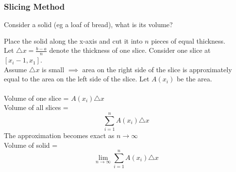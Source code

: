 \documentclass[english, 12pt]{article}
\begin{document}
\subsubsection{Slicing Method}
Consider a solid (eg a loaf of bread), what is its volume?
\begin{sol}
Place the solid along the x-axis and cut it into $n$ pieces of equal thickness.\\
Let $\triangle x = \frac{b-a}{n}$ denote the thickness of one slice. Consider one slice at $[x_{i}-1,x_{1}]$.\\
Assume $\triangle x$ is small $\implies$ area on the right side of the slice is approximately equal to the area on the left side of the slice. Let $A(x_{i})$ be the area.\\\\
Volume of one slice = $A(x_{i}) \triangle x$\\
Volume of all slices = \[\sum_{i=1}^{n} A(x_{i}) \triangle x\]
The approximation becomes exact as $n \to \infty$\\
 Volume of solid = \[\lim_{n \to \infty} \sum_{i=1}^{n} A(x_{i}) \triangle x\]
\end{sol}
\end{document}
